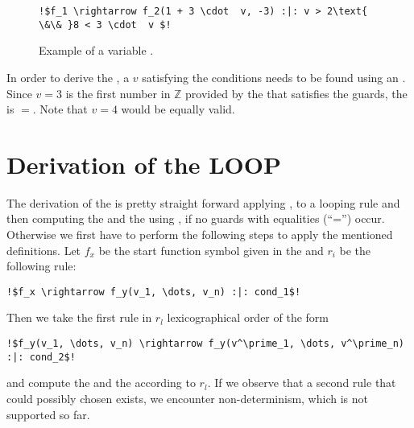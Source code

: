 \newsavebox{\stemextwo}%
\newsavebox{\stemextwosecond}%
\begin{figure}[H]
	\begin{lstlisting}[escapechar=!]
	!$f_1 \rightarrow f_2(1 + 3 \cdot  v, -3) :|: v > 2\text{ \&\& }8 < 3 \cdot  v $!
	\end{lstlisting}	
	\caption{Example of a variable \stem.}
	\label{lst:stem-var}
\end{figure}
In order to derive the \stem, a $v$ satisfying the conditions needs to be found using an \solver. Since $v=3$ is the first number in $\mathbb{Z}$ provided by the \solver that satisfies the guards, the \stem is \usebox{\stemextwo}$=$\usebox{\stemextwosecond}. Note that $v=4$ would be equally valid.

\section{Derivation of the LOOP}
\label{sec:loop}
The derivation of the \loopt is pretty straight forward applying ,  to a looping rule and then computing the \iterationmatrix and the \iterationconstants using , if no guards with equalities (``='') occur. Otherwise we first have to perform the following steps to apply the mentioned definitions. \newline
Let $f_x$ be the start function symbol given in the \its and $r_i$ be the following rule:
\begin{lstlisting}[escapechar=!]
	!$f_x \rightarrow f_y(v_1, \dots, v_n) :|: cond_1$!
\end{lstlisting} 
Then we take the first rule in $r_l$ lexicographical order of the form 
\begin{lstlisting}[escapechar=!]
	!$f_y(v_1, \dots, v_n) \rightarrow f_y(v^\prime_1, \dots, v^\prime_n) :|: cond_2$!
\end{lstlisting}
and compute the \iterationmatrix and the \iterationconstants according to $r_l$. 
If we observe that a second rule that could possibly chosen exists, we encounter non-determinism, which is not supported so far.

